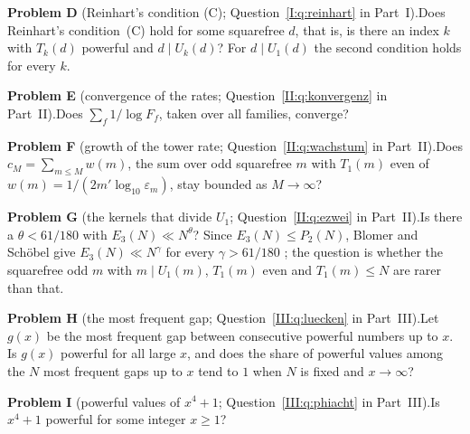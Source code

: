 \par\medskip\noindent\textbf{Problem D} (Reinhart's condition (C); Question~\ref{I:q:reinhart} in Part~I).\enspace Does Reinhart's condition~(C) \cite[Definition~1.4]{Reinhart2024} hold for some squarefree $d$, that is, is there an index $k$ with $T_k(d)$ powerful and $d \mid U_k(d)$? For $d \mid U_1(d)$ the second condition holds for every $k$.
\par\medskip\noindent\textbf{Problem E} (convergence of the rates; Question~\ref{II:q:konvergenz} in Part~II).\enspace Does $\sum_f 1/\log F_f$, taken over all families, converge?
\par\medskip\noindent\textbf{Problem F} (growth of the tower rate; Question~\ref{II:q:wachstum} in Part~II).\enspace Does $c_M = \sum_{m \le M} w(m)$, the sum over odd squarefree $m$ with $T_1(m)$ even of $w(m) = 1/(2m' \log_{10} \varepsilon_m)$, stay bounded as $M \to \infty$?
\par\medskip\noindent\textbf{Problem G} (the kernels that divide $U_1$; Question~\ref{II:q:ezwei} in Part~II).\enspace Is there a $\theta < 61/180$ with $E_3(N) \ll N^{\theta}$? Since $E_3(N) \le P_2(N)$, Blomer and Sch{\"o}bel give $E_3(N) \ll N^{\gamma}$ for every $\gamma > 61/180$ \cite[Theorem~3]{BlomerSchoebel2013}; the question is whether the squarefree odd $m$ with $m \mid U_1(m)$, $T_1(m)$ even and $T_1(m) \le N$ are rarer than that.
\par\medskip\noindent\textbf{Problem H} (the most frequent gap; Question~\ref{III:q:luecken} in Part~III).\enspace Let $g(x)$ be the most frequent gap between consecutive powerful numbers up to $x$. Is $g(x)$ powerful for all large $x$, and does the share of powerful values among the $N$ most frequent gaps up to $x$ tend to $1$ when $N$ is fixed and $x \to \infty$?
\par\medskip\noindent\textbf{Problem I} (powerful values of $x^4 + 1$; Question~\ref{III:q:phiacht} in Part~III).\enspace Is $x^4 + 1$ powerful for some integer $x \ge 1$?
